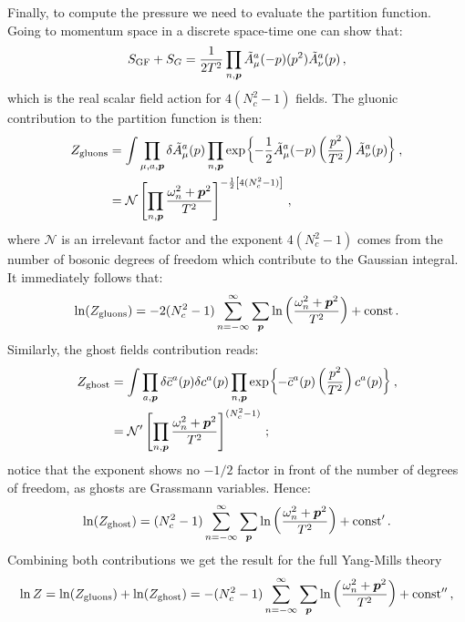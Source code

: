 \documentclass{article}
\begin{document}
Finally, to compute the pressure we need to evaluate the partition function. Going to momentum space in a discrete space-time one can show that:
\begin{equation}
    S_{\textrm{GF}} + S_G = \frac{1}{2T^2}\prod_{n, \vb*{p}} \tilde{A}_\mu^a (-p) (p^2) \tilde{A}_\nu^a (p) \, , 
\end{equation}
which is the real scalar field action for $4(N_c^2 - 1)$ fields.
The gluonic contribution to the partition function is then:
\begin{align*}
    Z_{\textrm{gluons}} &= \int \prod_{\mu, a, \vb*{p}} \delta \tilde{A}_\mu^a(p) \prod_{n, \vb*{p}} \exp{-\frac{1}{2} \tilde{A}_\mu^a (-p) \left(\frac{p^2}{T^2}\right) \tilde{A}_\nu^a (p)} \, , \\
        &= \mathcal{N} \left[ \prod_{n, \vb*{p}} \frac{\omega_n^2 + \vb*{p}^2}{T^2} \right]^{-\frac{1}{2} \left[ 4(N^2_c - 1) \right]} \, , 
\end{align*}
where $\mathcal{N}$ is an irrelevant factor and the exponent $4(N_c^2 - 1)$ comes from the number of bosonic degrees of freedom which contribute to the Gaussian integral. It immediately follows that:
\begin{equation}\label{eq: Zgluons}
    \ln(Z_{\textrm{gluons}}) = -2(N_c^2 - 1) \sum_{n = -\infty}^{\infty} \sum_{\vb*{p}} \ln \left( \frac{\omega_n^2 + \vb*{p}^2}{T^2} \right) + \textrm{const} \, .
\end{equation}
Similarly, the ghost fields contribution reads:
\begin{align*}
    Z_{\textrm{ghost}} &= \int \prod_{a, \vb*{p}} \delta \bar{c}^a(p) \delta c^a(p) \prod_{n, \vb*{p}} \exp{- \bar{c}^a (p) \left(\frac{p^2}{T^2}\right) c^a (p)} \, , \\
        &= \mathcal{N}' \left[ \prod_{n, \vb*{p}} \frac{\omega_n^2 + \vb*{p}^2}{T^2} \right]^{(N^2_c - 1)} \, ;
\end{align*}
notice that the exponent shows no $-1/2$ factor in front of the number of degrees of freedom, as ghosts are Grassmann variables. Hence:
\begin{equation}\label{eq: Zghost}
    \ln(Z_{\textrm{ghost}}) = (N_c^2 - 1) \sum_{n = -\infty}^{\infty} \sum_{\vb*{p}} \ln \left( \frac{\omega_n^2 + \vb*{p}^2}{T^2} \right) + \textrm{const}' \, .
\end{equation}
Combining both contributions we get the result for the full Yang-Mills theory
\begin{equation}
    \ln Z = \ln(Z_{\textrm{gluons}}) + \ln(Z_{\textrm{ghost}}) = -(N_c^2 - 1) \sum_{n = -\infty}^{\infty} \sum_{\vb*{p}} \ln \left( \frac{\omega_n^2 + \vb*{p}^2}{T^2} \right) + \textrm{const}'' \, ,
\end{equation}
\end{document}
